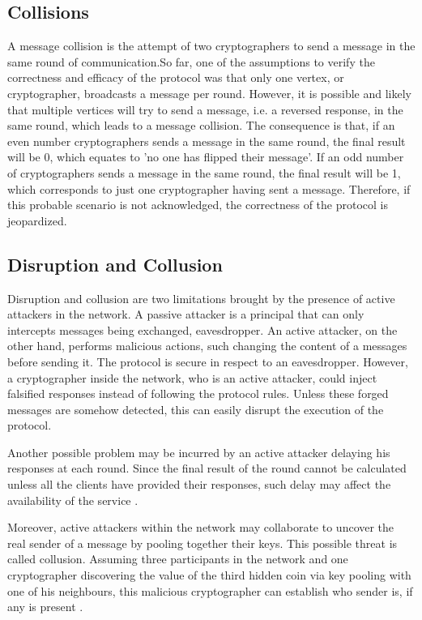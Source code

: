 \subsection{Collisions}
A message collision is the attempt of two cryptographers to send a message in the same round of communication.So far, one of the assumptions to verify the correctness and efficacy of the protocol was that only one vertex, or cryptographer, broadcasts a message per round. However, it is possible and likely that multiple vertices will try to send a message, i.e. a reversed response, in the same round, which leads to a message collision. The consequence is that, if an even number cryptographers sends a message in the same round, the final result will be 0, which equates to 'no one has flipped their message'. If an odd number of cryptographers sends a message in the same round, the final result will be 1, which corresponds to just one cryptographer having sent a message.
Therefore, if this probable scenario is not acknowledged, the correctness of the protocol is jeopardized.

\subsection{Disruption and Collusion} \label{sec:disruptionlimitation}
Disruption and collusion are two limitations brought by the presence of active attackers in the network. A passive attacker is a principal that can only intercepts messages being exchanged, eavesdropper. An active attacker, on the other hand, performs malicious actions, such changing the content of a messages before sending it. The protocol is secure in respect to an eavesdropper. However, a cryptographer inside the network, who is an active attacker, could inject falsified responses instead of following the protocol rules. Unless these forged messages are somehow detected, this can easily disrupt the execution of the protocol.

Another possible problem may be incurred by an active attacker delaying his responses at each round. Since the final result of the round cannot be calculated unless all the clients have provided their responses, such delay may affect the availability of the service \cite{Fischer}.

Moreover, active attackers within the network may collaborate to uncover the real sender of a message by pooling together their keys. This possible threat is called collusion. Assuming three participants in the network and one cryptographer discovering the value of the third hidden coin via key pooling with one of his neighbours, this malicious cryptographer can establish who sender is, if any is present \cite{Chaum}. 

